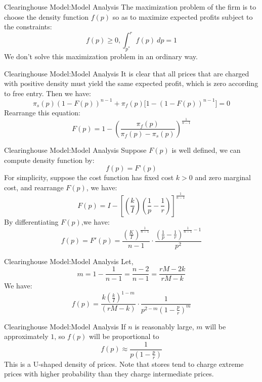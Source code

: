 \documentclass[aspectratio=169]{beamer}  %
\begin{document}
\begin{frame}{Clearinghouse Model:Model Analysis}
    The maximization problem of the firm is to choose the density function $f(p)$ so as to maximize expected profits subject to the constraints:
    $$
    f(p)\geq 0, \int_{p^*}^rf(p)\ dp=1
    $$
    We don’t solve this maximization problem in an ordinary way.
\end{frame}

\begin{frame}{Clearinghouse Model:Model Analysis}
        It is clear that all prices that are charged with positive density must yield the same expected profit, which is zero according to free entry.
        Then we have:
        $$
        \pi_s(p) (1 - F(p))^{n-1}+ \pi_f(p)  \bigg[1 -(1 - F(p))^{n-1} \bigg]=0
        $$
        Rearrange this equation:
        $$  
        F(p) =1- \left( \frac{\pi_f(p)}{\pi_f(p) - \pi_s(p)} \right)^{\frac{1}{n-1}} 
        $$
\end{frame}

\begin{frame}{Clearinghouse Model:Model Analysis}
    Suppose $F(p)$ is well defined, we can compute density function by:
    $$
    f(p)=F’(p)
    $$
    For simplicity, suppose the cost function has fixed cost $k>0$ and zero marginal cost, and rearrange $F(p)$, we have:
    $$  
    F(p) = I - \left[ \left( \frac{k}{I} \right) \left( \frac{1}{p} - \frac{1}{r} \right) \right]^{\frac{1}{n-1}}
    $$
    By differentiating $F(p)$,we have:
    $$
    f(p) = F'(p) = \frac{(\frac{K}{I})^{\frac{1}{n-1}}}{n-1} \cdot \frac{\left( \frac{1}{p} - \frac{1}{r} \right)^{\frac{1}{n-1}-1}}{p^2}
    $$
\end{frame}

\begin{frame}{Clearinghouse Model:Model Analysis}
    Let,
    $$
    m = 1 - \frac{1}{n-1} = \frac{n-2}{n-1} = \frac{rM - 2k}{rM - k}
    $$
    We have:
    $$  
    f(p) = \frac{k\left( \frac{k}{I} \right)^{1-m}}{(rM - k)} \cdot \frac{1}{p^{2-m}\left( 1 - \frac{p}{r} \right)^m}
    $$
\end{frame}

\begin{frame}{Clearinghouse Model:Model Analysis}
    If $n$ is reasonably large, $m$ will be approximately $1$, so $f(p)$ will be proportional to
    $$
    f(p)\approx \frac{1}{p\left( 1-\frac{p}{r} \right)}
    $$
    This is a U-shaped density of prices. Note that stores tend to charge extreme prices with higher probability than they charge intermediate prices.
\end{frame}
\end{document}
